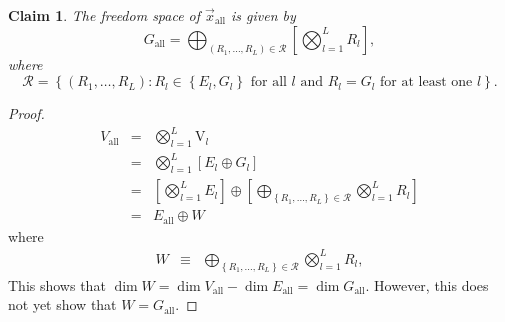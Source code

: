 \documentclass{article}
\numberwithin{myclaim}{section}
\newcommand{\set}[1]{\left\{ #1 \right\}}
\newtheorem{claim}{Claim}
\begin{document}
\begin{claim} \label{claim:G_all}
    The freedom space of $\vec{x}_\mathrm{all}$ is given by 
    \begin{equation}
        G_\mathrm{all} = \bigoplus_{(R_1, \ldots, R_L) \in \mathcal{R}} \left[ \bigotimes_{l=1}^L R_l \right],
    \end{equation}
    where
    \begin{equation}
        \mathcal{R} = \set{(R_1, \ldots, R_L): \textrm{$R_l \in \set{E_l, G_l}$ for all $l$ and $R_l = G_l$ for at least one $l$}}.
    \end{equation}
\end{claim}
\begin{proof}

\begin{eqnarray}
V_\mathrm{all} &=& \bigotimes_{l=1}^L \textrm{V}_l \\
&=&  \bigotimes_{l=1}^L  \left[ E_l \oplus G_l \right] \\
&=& \left[\bigotimes_{l=1}^L E_l\right] \oplus \left[\bigoplus_{\set{R_1, \ldots, R_L} \in \mathcal{R}} \bigotimes_{l=1}^L R_l \right] \\
&=& E_\mathrm{all} \oplus W
\end{eqnarray}
where 
\begin{eqnarray}
    W &\equiv & \bigoplus_{\set{R_1, \ldots, R_L} \in \mathcal{R}} \bigotimes_{l=1}^L R_l, %
\end{eqnarray}
This shows that $\dim W = \dim V_\mathrm{all} - \dim E_\mathrm{all} = \dim G_\mathrm{all}$. However, this does not yet show that $W = G_\mathrm{all}$.


\end{proof}
\end{document}

